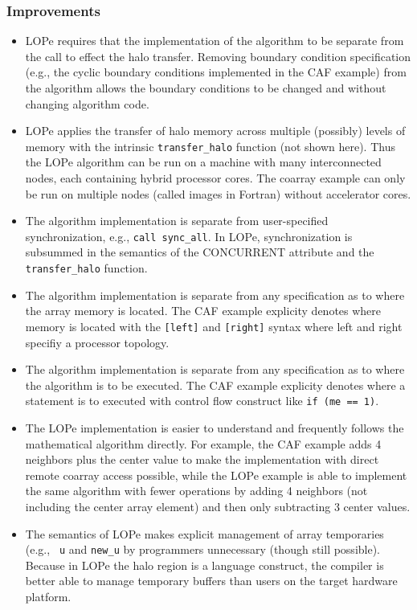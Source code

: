 \subsubsection{Improvements}
\begin{itemize}

\item
LOPe requires that the implementation of the algorithm to be separate from the
call to effect the halo transfer.  Removing boundary condition specification
(e.g., the cyclic boundary conditions implemented in the CAF example) from the
algorithm allows the boundary conditions to be changed and without changing
algorithm code.

\item
LOPe applies the transfer of halo memory across multiple (possibly) levels of
memory with the intrinsic {\tt transfer\_halo} function (not shown here).  Thus
the LOPe algorithm can be run on a machine with many interconnected nodes, each
containing hybrid processor cores.  The coarray example can only be run on
multiple nodes (called images in Fortran) without accelerator cores.

\item
The algorithm implementation is separate from user-specified synchronization,
e.g., {\tt call sync\_all}.  In LOPe, synchronization is subsummed in the
semantics of the CONCURRENT attribute and the {\tt transfer\_halo} function.

\item
The algorithm implementation is separate from any specification as to where the
array memory is located.  The CAF example explicity denotes where memory is
located with the {\tt [left]} and {\tt [right]} syntax where left and right
specifiy a processor topology.

\item
The algorithm implementation is separate from any specification as to where the
algorithm is to be executed.  The CAF example explicity denotes where a statement is to
executed with control flow construct like {\tt if (me == 1)}.

\item
The LOPe implementation is easier to understand and frequently follows the
mathematical algorithm directly.  For example, the CAF example adds 4 neighbors
plus the center value to make the implementation with direct remote coarray
access possible, while the LOPe example is able to implement the same algorithm
with fewer operations by adding 4 neighbors (not including the center array
element) and then only subtracting 3 center values.

\item
The semantics of LOPe makes explicit management of array temporaries (e.g., {\tt
  u} and {\tt new\_u} by programmers unnecessary (though still possible).
Because in LOPe the halo region is a language construct, the compiler is better
able to manage temporary buffers than users on the target hardware platform.

\end{itemize}

